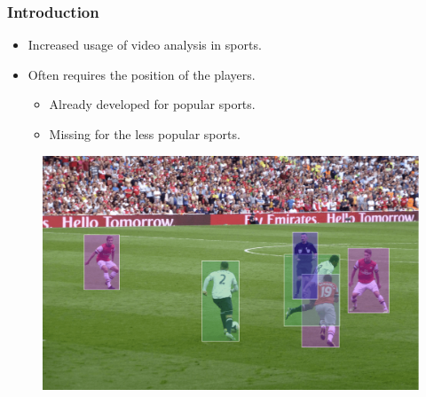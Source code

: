 \documentclass{beamer}
\begin{document}
\begin{frame}
    \frametitle{Introduction}
    \begin{minipage}{0.5\textwidth}
        \begin{itemize}
            \item<1-> Increased usage of video analysis in sports.
            \item<1-> Often requires the position of the players.
            \begin{itemize}
                \item Already developed for popular sports.
                \item Missing for the less popular sports.
            \end{itemize}
        \end{itemize}
    \end{minipage} \hfill
    \begin{minipage}{0.45\textwidth}
        \begin{figure}
            \center
            \includegraphics[width = \textwidth]{./entities/soccer_cv.png}
        \end{figure}
    \end{minipage}
\end{frame}
\end{document}
